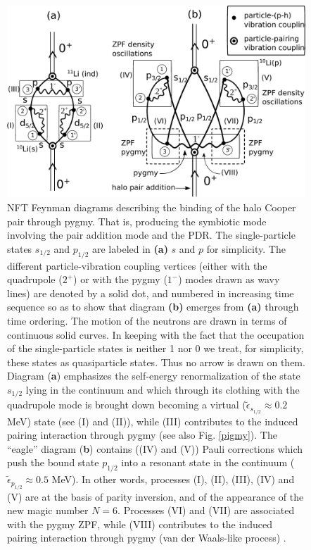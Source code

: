    \begin{figure}
   \centerline{\includegraphics*[width=17cm,angle=0]{nutshell/figs/VdW.pdf}}\caption[NFT Feynman diagrams describing the binding of the halo Cooper pair through pygmy.]{NFT Feynman diagrams describing the binding of the halo Cooper pair through pygmy. That is, producing the symbiotic mode involving the pair addition mode and the PDR. The single-particle states $s_{1/2}$ and $p_{1/2}$ are labeled in \textbf{(a)} $s$ and $p$ for simplicity. The different particle-vibration coupling vertices (either with the quadrupole ($2^+$) or with the pygmy ($1^-$) modes drawn as  wavy lines) are denoted by a solid dot, and numbered in increasing time sequence so as to show that diagram \textbf{(b)} emerges from \textbf{(a)} through time ordering. The motion of the neutrons are drawn in terms of continuous solid curves. In keeping with the fact that the occupation of the single-particle states is neither 1 nor 0 we treat, for simplicity, these states  as quasiparticle states. Thus no arrow is drawn on them. Diagram (\textbf{a}) emphasizes the self-energy renormalization of the state $s_{1/2}$ lying in the continuum and which   through its clothing with the quadrupole mode is brought down becoming a virtual ($\widetilde\epsilon_{s_{1/2}}\approx0.2$ MeV) state (see (I) and (II)), while (III) contributes to the induced pairing interaction through pygmy (see also Fig. \ref{pigmy}). The ``eagle'' diagram (\textbf{b}) contains ((IV) and (V)) Pauli corrections which push the bound state $p_{1/2}$ into a resonant state in the continuum ($\widetilde\epsilon_{p_{1/2}}\approx0.5$ MeV). In other words, processes (I), (II), (III), (IV) and (V) are at the basis of parity inversion, and of the appearance of the new magic number $N=6$. Processes (VI) and (VII) are associated with the pygmy ZPF, while (VIII) contributes to the induced pairing interaction through pygmy (van der Waals-like process) 
   	.}\label{fig2.A.1}
   \end{figure}

